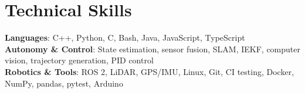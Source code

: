 \documentclass[letterpaper,11pt]{article}
\begin{document}
\section{\textbf{Technical Skills}}
 \begin{itemize}[leftmargin=0.15in, label={}]
    \small{\item{
     \textbf{Languages}{: C++, Python, C, Bash, Java, JavaScript, TypeScript} \\
     \textbf{Autonomy \& Control}{: State estimation, sensor fusion, SLAM, IEKF, computer vision, trajectory generation, PID control} \\
     \textbf{Robotics \& Tools}{: ROS 2, LiDAR, GPS/IMU, Linux, Git, CI testing, Docker, NumPy, pandas, pytest, Arduino}
    }}
 \end{itemize}




\end{document}
